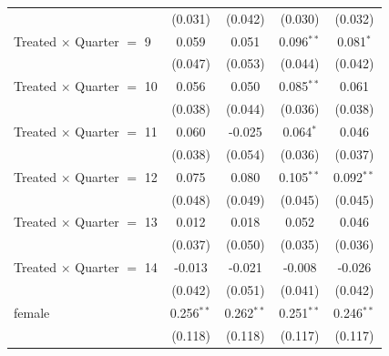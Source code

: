 \begin{longtable}{lcccc}
                                  & (0.031)                                            & (0.042)        & (0.030)        & (0.032)        \\
  Treated $\times$ Quarter $=$ 9  & 0.059                                              & 0.051          & 0.096$^{**}$   & 0.081$^{*}$    \\
                                  & (0.047)                                            & (0.053)        & (0.044)        & (0.042)        \\
  Treated $\times$ Quarter $=$ 10 & 0.056                                              & 0.050          & 0.085$^{**}$   & 0.061          \\
                                  & (0.038)                                            & (0.044)        & (0.036)        & (0.038)        \\
  Treated $\times$ Quarter $=$ 11 & 0.060                                              & -0.025         & 0.064$^{*}$    & 0.046          \\
                                  & (0.038)                                            & (0.054)        & (0.036)        & (0.037)        \\
  Treated $\times$ Quarter $=$ 12 & 0.075                                              & 0.080          & 0.105$^{**}$   & 0.092$^{**}$   \\
                                  & (0.048)                                            & (0.049)        & (0.045)        & (0.045)        \\
  Treated $\times$ Quarter $=$ 13 & 0.012                                              & 0.018          & 0.052          & 0.046          \\
                                  & (0.037)                                            & (0.050)        & (0.035)        & (0.036)        \\
  Treated $\times$ Quarter $=$ 14 & -0.013                                             & -0.021         & -0.008         & -0.026         \\
                                  & (0.042)                                            & (0.051)        & (0.041)        & (0.042)        \\
  female                          & 0.256$^{**}$                                       & 0.262$^{**}$   & 0.251$^{**}$   & 0.246$^{**}$   \\
                                  & (0.118)                                            & (0.118)        & (0.117)        & (0.117)        \\

\end{longtable}
